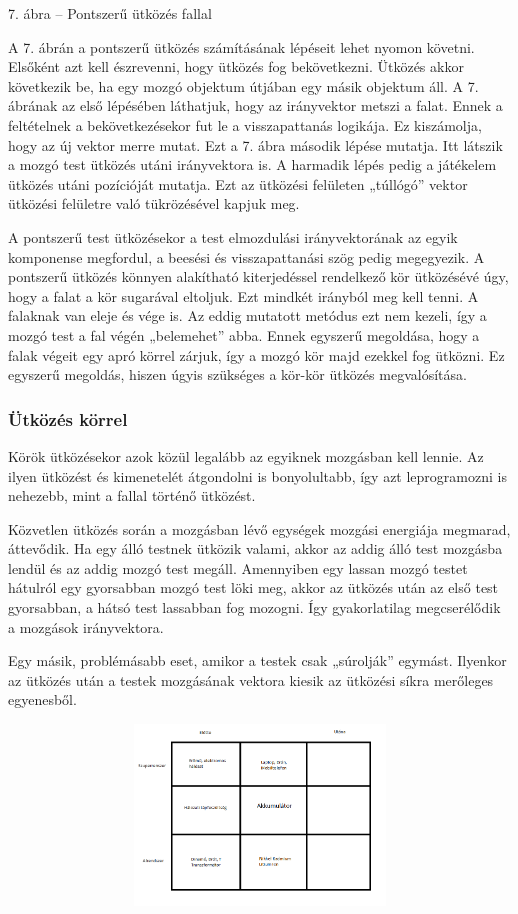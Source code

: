 \documentclass[bibliography=totocnumbered]{article}
\begin{document}
7. ábra -- Pontszerű ütközés fallal

A 7. ábrán a pontszerű ütközés számításának lépéseit lehet nyomon
követni. Elsőként azt kell észrevenni, hogy ütközés fog bekövetkezni.
Ütközés akkor következik be, ha egy mozgó objektum útjában egy másik
objektum áll. A 7. ábrának az első lépésében láthatjuk, hogy az
irányvektor metszi a falat. Ennek a feltételnek a bekövetkezésekor fut
le a visszapattanás logikája. Ez kiszámolja, hogy az új vektor merre
mutat. Ezt a 7. ábra második lépése mutatja. Itt látszik a mozgó test
ütközés utáni irányvektora is. A harmadik lépés pedig a játékelem
ütközés utáni pozícióját mutatja. Ezt az ütközési felületen „túllógó''
vektor ütközési felületre való tükrözésével kapjuk meg.

A pontszerű test ütközésekor a test elmozdulási irányvektorának az egyik
komponense megfordul, a beesési és visszapattanási szög pedig
megegyezik. A pontszerű ütközés könnyen alakítható kiterjedéssel
rendelkező kör ütközésévé úgy, hogy a falat a kör sugarával eltoljuk.
Ezt mindkét irányból meg kell tenni. A falaknak van eleje és vége is. Az
eddig mutatott metódus ezt nem kezeli, így a mozgó test a fal végén
„belemehet'' abba. Ennek egyszerű megoldása, hogy a falak végeit egy
apró körrel zárjuk, így a mozgó kör majd ezekkel fog ütközni. Ez
egyszerű megoldás, hiszen úgyis szükséges a kör-kör ütközés
megvalósítása.


\subsubsection{Ütközés körrel}

Körök ütközésekor azok közül legalább az egyiknek mozgásban kell lennie.
Az ilyen ütközést és kimenetelét átgondolni is bonyolultabb, így azt
leprogramozni is nehezebb, mint a fallal történő ütközést.

Közvetlen ütközés során a mozgásban lévő egységek mozgási energiája
megmarad, áttevődik. Ha egy álló testnek ütközik valami, akkor az addig
álló test mozgásba lendül és az addig mozgó test megáll. Amennyiben egy
lassan mozgó testet hátulról egy gyorsabban mozgó test löki meg, akkor
az ütközés után az első test gyorsabban, a hátsó test lassabban fog
mozogni. Így gyakorlatilag megcserélődik a mozgások irányvektora.

Egy másik, problémásabb eset, amikor a testek csak „súrolják'' egymást.
Ilyenkor az ütközés után a testek mozgásának vektora kiesik az ütközési
síkra merőleges egyenesből.

\includegraphics[width=5.51181in,height=1.89525in]{media/image4.png}
\end{document}
